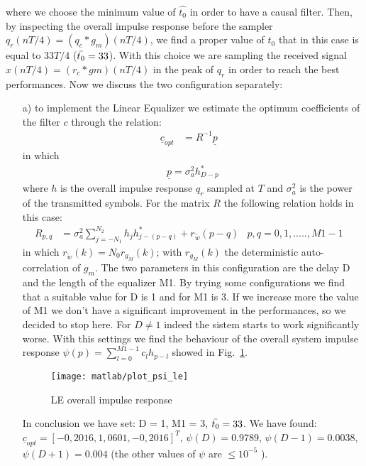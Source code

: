 \documentclass[a4paper,oneside]{article}
\renewcommand{\vec}[1]{\underline{#1}}
\begin{document}
{\color{red}where we choose the minimum value of $\hat{t_0}$} in order to have a causal filter. 
Then, by inspecting the overall impulse response before the sampler $q_r(n T/4) = (q_c * g_m)(n T/4)$, we find a proper value of $t_0$ that in this case is equal to $33T/4$ ($\Bar{t_0} = 33$). With this choice we are sampling the received signal $x(nT/4) = (r_c*gm)(nT/4)$ in the peak of $q_r$ {\color{red} in order to reach the best performances}.
Now we discuss the two configuration separately:
\begin{itemize}
\item[a)] to implement the Linear Equalizer we estimate the optimum coefficients of the filter $c$ through the relation:
\begin{align}
\vec{c}_{opt}& = R^{-1} \vec{p}& 
\end{align} 
in which 
\begin{align}
&\vec{p} = \sigma_a^2 h_{D-p}^*&	
\end{align}
where $h$ is the overall impulse response $q_r$ sampled at $T$ and $\sigma_a^2$ is the power of the transmitted symbols. For the matrix $R$ the following relation holds in this case:
\begin{align}
 R_{p,q} &= \sigma^2_a \sum_{j=-N_1}^{N_2}h_jh^*_{j-(p-q)} + r_{\tilde{w}}(p-q) & p,q = 0,1,.....,M1-1&
\end{align}
in which $r_{\tilde{w}}(k) = N_0 r_{g_M}(k)$; with $r_{g_M}(k)$ the deterministic auto-correlation of $g_m$.
The two parameters in this configuration are the delay D and the length of the  equalizer M1. By trying some configurations we find that a suitable value for D is 1 and for M1 is 3. If we increase more the value of M1 we don't have a significant improvement in the performances, so we decided to stop here. {\color{red} For $D\neq 1$ indeed the sistem starts to work significantly worse}. With this settings we find the behaviour of the overall system impulse response $\psi(p) = \sum_{l=0}^{M1-1} c_l h_{p-l}$ showed in Fig.~\ref{plot:psi_le}. 

\begin{figure}[h]
  \centering
  \texttt{[image: matlab/plot\_psi\_le]}
  \caption{LE overall impulse response}
  \label{plot:psi_le}
\end{figure}

\newpage In conclusion we have set: D = 1, M1 = 3, $\Bar{t_0} = 33$. 
\newline We have found: $\vec{c}_{opt} = [-0,2016, 1,0601, -0,2016]^T$,{\color{red} $\psi(D) = 0.9789$, $\psi(D-1) = 0.0038$, $\psi(D+1) = 0.004$ (the other values of $\psi$ are $\leq 10^{-5}$ ).}


\end{itemize}
\end{document}
